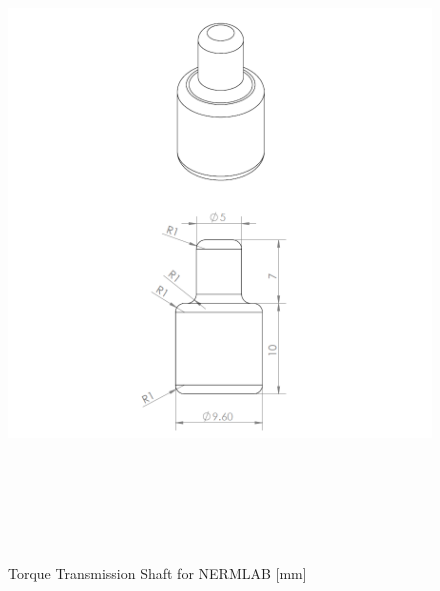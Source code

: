 \begin{figure}[htb]%
	\begin{center}
		\includegraphics[height=7in]{figures/drawings/torque_transmission_shaft_drawing.png}
		
		\caption[Torque Transmission Shaft for NERMLAB]{Torque Transmission Shaft for NERMLAB [mm]}
		
		\label{torque_transmission_shaft_drawing}
	\end{center}
\end{figure}



